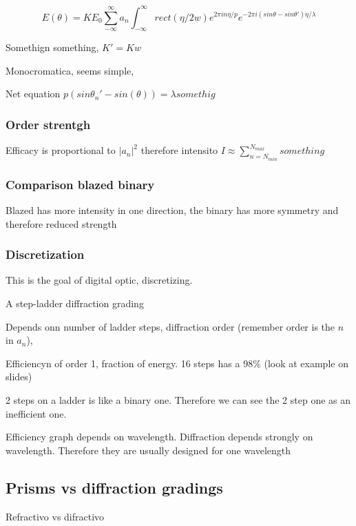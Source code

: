 \documentclass[../main/main.tex]{subfiles}
\begin{document}
\begin{equation}
E(\theta) = K E_{0}\sum_{-\infty}^{\infty} a_{n} \int_{-\infty}^{\infty} rect(\eta/2w) e^{2\pi i n \eta / p}e^{-2 \pi i (sin \theta - sin \theta') \eta/\lambda}
\end{equation}

Somethign something, $K' = Kw$

Monocromatica, seems simple,

Net equation $p (sin \theta_{n}' - sin(\theta)) = \lambda somethig$

\subsubsection{Order strentgh}

Efficacy is proportional to $|a_{n}|^{2}$ therefore intensito $I \approx \sum_{n=N_{min}}^{N_{max}} something$


\subsubsection{Comparison blazed binary}

Blazed has more intensity in one direction, the binary has more symmetry and therefore reduced strength

\subsubsection{Discretization}

This is the goal of digital optic, discretizing.

A step-ladder diffraction grading

Depends onn number of ladder steps, diffraction order (remember order is the $n$ in $a_{n}$),

Efficiencyn of order 1, fraction of energy. 16 steps has a 98\% (look at example on slides)

2 steps on a ladder is like a binary one. Therefore we can see the 2 step one as an inefficient one.


Efficiency graph depends on wavelength. Diffraction depends strongly on wavelength. Therefore they are usually designed for one wavelength


\subsection{Prisms vs diffraction gradings}

Refractivo vs difractivo
\end{document}
